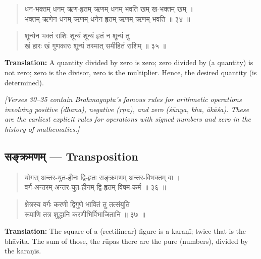 \documentclass[11pt,a4paper]{article}
\newcommand{\cnote}[1]{\textcolor{notecolor}{\textit{#1}}}
\newcommand{\dev}[1]{{\devanagarifont #1}}
\newenvironment{shloka}{\begin{verse}\devanagarifont\large}{\end{verse}}
\begin{document}
\vspace{0.3cm}

\begin{shloka}
धन-भक्तम् धनम् ऋण-हृतम् ऋणम् धनम् भवति खम् ख-भक्तम् खम् ।\\
भक्तम् ऋणेन धनम् ऋणम् धनेन हृतम् ऋणम् ऋणम् भवति ॥ ३४ ॥
\end{shloka}

\begin{shloka}
शून्येन भक्तं राशिः शून्यं शून्यं हृतं न शून्यं तु \\
खं हारः खं गुणकारः शून्यं तस्मात् समीहितं राशिम् ॥ ३५ ॥
\end{shloka}

\textbf{Translation:}\quad
A quantity divided by zero is zero; zero divided by (a quantity) is
not zero; zero is the divisor, zero is the multiplier. Hence, the
desired quantity (is determined).

\vspace{0.3cm}
\cnote{[Verses 30–35 contain Brahmagupta's famous rules for arithmetic
operations involving positive (\textit{dhana}), negative
(\textit{ṛṇa}), and zero (\textit{śūnya}, \textit{kha}, \textit{ākāśa}).
These are the earliest explicit rules for operations with signed
numbers and zero in the history of mathematics.]}

\newpage

\subsection*{\dev{सङ्क्रमणम् — Transposition}}

\begin{shloka}
योगस् अन्तर-युत-हीनः द्वि-हृतः सङ्क्रमणम् अन्तर-विभक्तम् वा ।\\
वर्ग-अन्तरम् अन्तर-युत-हीनम् द्वि-हृतम् विषम-कर्म ॥ ३६ ॥
\end{shloka}

\vspace{0.3cm}

\begin{shloka}
क्षेत्रस्य वर्गः करणी द्विगुणे भावितं तु तत्संयुति \\
रूपाणि तत्र शुद्धानि करणीभिर्विभाजितानि ॥ ३७ ॥
\end{shloka}

\textbf{Translation:}\quad
The square of a (rectilinear) figure is a karaṇī; twice that is the
bhāvita. The sum of those, the rūpas there are the pure (numbers),
divided by the karaṇīs.
\end{document}
